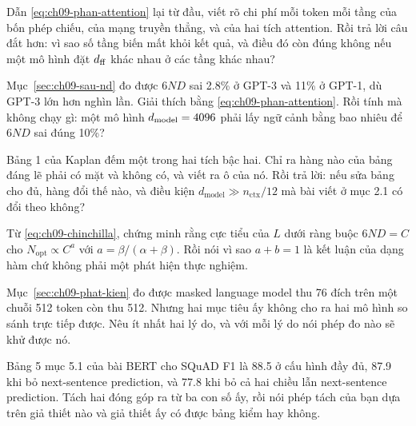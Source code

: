 \exercises

\tierunderstand

\begin{bt}
  \item Dẫn \eqref{eq:ch09-phan-attention} lại từ đầu, viết rõ chi phí mỗi
    token mỗi tầng của bốn phép chiếu, của mạng truyền thẳng, và của hai tích
    attention. Rồi trả lời câu đắt hơn: vì sao số tầng biến mất khỏi kết quả,
    và điều đó còn đúng không nếu một mô hình đặt \(d_{\mathrm{ff}}\) khác nhau ở các tầng
    khác nhau?

  \item Mục~\ref{sec:ch09-sau-nd} đo được \(6ND\) sai 2.8\% ở GPT-3 và 11\% ở
    GPT-1, dù GPT-3 lớn hơn nghìn lần. Giải thích bằng
    \eqref{eq:ch09-phan-attention}. Rồi tính mà không chạy gì: một mô hình
    \(d_{\mathrm{model}} = 4096\) phải lấy ngữ cảnh bằng bao nhiêu để \(6ND\) sai đúng
    10\%?

  \item Bảng 1 của Kaplan đếm một trong hai tích bậc hai. Chỉ ra hàng nào của
    bảng đáng lẽ phải có mặt và không có, và viết ra ô 
    của nó. Rồi trả lời: nếu sửa bảng cho đủ, hàng  đổi thế nào, và
    điều kiện \(d_{\mathrm{model}} \gg n_{\mathrm{ctx}}/12\) mà bài viết ở mục
    2.1 có đổi theo không?

  \item Từ \eqref{eq:ch09-chinchilla}, chứng minh rằng cực tiểu của \(L\) dưới
    ràng buộc \(6ND = C\) cho \(N_{\mathrm{opt}} \propto C^{a}\) với
    \(a = \beta/(\alpha+\beta)\). Rồi nói vì sao \(a + b = 1\) là kết luận của
    dạng hàm chứ không phải một phát hiện thực nghiệm.

  \item Mục~\ref{sec:ch09-phat-kien} đo được masked language model thu 76 đích
    trên một chuỗi 512 token còn  thu 512.
    Nhưng hai mục tiêu
    ấy không cho ra hai mô hình so sánh trực tiếp được. Nêu ít nhất hai lý do,
    và với mỗi lý do nói phép đo nào sẽ khử được nó.

  \item Bảng 5 mục 5.1 của bài BERT cho SQuAD F1 là 88.5 ở cấu hình đầy đủ,
    87.9 khi bỏ next-sentence prediction, và 77.8 khi bỏ cả hai chiều lẫn
    next-sentence prediction. Tách hai đóng góp ra từ ba con số ấy, rồi nói
    phép tách của bạn dựa trên giả thiết nào và giả thiết ấy có được bảng kiểm
    hay không.


\end{bt}
